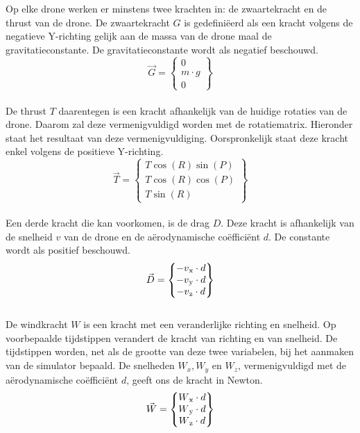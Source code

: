 \noindent
Op elke drone werken er minstens twee krachten in: de zwaartekracht en de thrust van de drone. De zwaartekracht \(G\) is gedefiniëerd als een kracht volgens de negatieve Y-richting gelijk aan de massa van de drone maal de gravitatieconstante. De gravitatieconstante wordt als negatief beschouwd.
\begin{equation*}
\vec{G} = 
\begin{Bmatrix}
0 \\
m \cdot g \\
0
\end{Bmatrix} \label{zwaartekracht}
\end{equation*}
\\
De thrust \(T\) daarentegen is een kracht afhankelijk van de huidige rotaties van de drone. Daarom zal deze vermenigvuldigd worden met de rotatiematrix. Hieronder staat het resultaat van deze vermenigvuldiging. Oorspronkelijk staat deze kracht enkel volgens de positieve Y-richting. 
\\
\begin{equation*}
\vec{T} =
\begin{Bmatrix}
T \cos(R) \sin(P) \\
T \cos(R)\cos(P)\\
T \sin(R)
\end{Bmatrix} \label{thrustkracht}
\end{equation*}
\\
Een derde kracht die kan voorkomen, is de drag \(D\). Deze kracht is afhankelijk van de snelheid \(v\) van de drone en de a\"erodynamische coëfficiënt \(d\). De constante wordt als positief beschouwd.
\begin{equation*}
\vec{D} =
\begin{Bmatrix}
-v\textsubscript{x} \cdot d \\
-v\textsubscript{y} \cdot d \\
-v\textsubscript{z} \cdot d 
\end{Bmatrix} \label{dragkracht}
\end{equation*}
\\
De windkracht \(W\) is een kracht met een veranderlijke richting en snelheid. Op voorbepaalde tijdstippen verandert de kracht van richting en  van snelheid. De tijdstippen worden, net als de grootte van deze twee variabelen, bij het aanmaken van de simulator bepaald. De snelheden \(W_x, W_y\) en \(W_z\), vermenigvuldigd met de a\"erodynamische coëfficiënt \(d\), geeft ons de kracht in Newton. 
\begin{equation*}
\vec{W} = 
\begin{Bmatrix}
W\textsubscript{x} \cdot d \\
W\textsubscript{y} \cdot d \\
W\textsubscript{z} \cdot d 
\end{Bmatrix} \label{windkracht}
\end{equation*}
